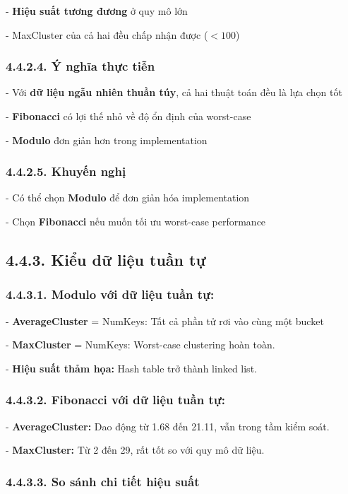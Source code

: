 \documentclass[12pt,a4paper]{report}
\begin{document}
    - \textbf{Hiệu suất tương đương} ở quy mô lớn
    
    - MaxCluster của cả hai đều chấp nhận được ($< 100$)

\subsubsection*{4.4.2.4. Ý nghĩa thực tiễn}
    \noindent \indent - Với \textbf{dữ liệu ngẫu nhiên thuần túy}, cả hai thuật toán đều là lựa chọn tốt
    
    - \textbf{Fibonacci} có lợi thế nhỏ về độ ổn định của worst-case
    
    - \textbf{Modulo} đơn giản hơn trong implementation

\subsubsection*{4.4.2.5. Khuyến nghị}
    \noindent \indent - Có thể chọn \textbf{Modulo} để đơn giản hóa implementation
    
    - Chọn \textbf{Fibonacci} nếu muốn tối ưu worst-case performance
\subsection*{4.4.3. Kiểu dữ liệu tuần tự}

\subsubsection*{4.4.3.1. Modulo với dữ liệu tuần tự:}
    \noindent \indent - \textbf{AverageCluster} = NumKeys: Tất cả phần tử rơi vào cùng một bucket
    
    - \textbf{MaxCluster} = NumKeys: Worst-case clustering hoàn toàn.
    
    - \textbf{Hiệu suất thảm họa:} Hash table trở thành linked list.
    
\subsubsection*{4.4.3.2. Fibonacci với dữ liệu tuần tự:}
    \noindent \indent - \textbf{AverageCluster:} Dao động từ 1.68 đến 21.11, vẫn trong tầm kiểm soát.
    
    - \textbf{MaxCluster:} Từ 2 đến 29, rất tốt so với quy mô dữ liệu.

\subsubsection*{4.4.3.3. So sánh chi tiết hiệu suất}
\end{document}

